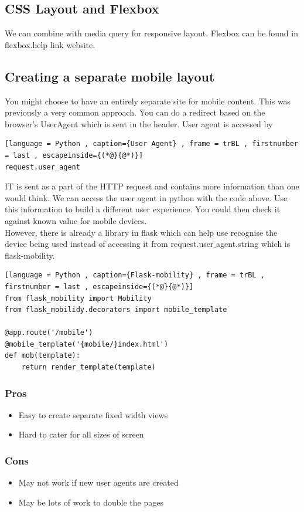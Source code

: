 \documentclass[a4paper]{article}
\theoremstyle{plain}
\theoremstyle{definition}
\theoremstyle{remark}
\begin{document}
\begin{flushleft}
\subsection{CSS Layout and Flexbox}
We can combine with media query for responsive layout. Flexbox can be found in flexbox.help link website. 
\subsection{Creating a separate mobile layout}
You might choose to have an entirely separate site for mobile content. This was previously a very common approach. You can do a redirect based on the browser's UserAgent which is sent in the header. User agent is accessed by
\begin{lstlisting}[language = Python , caption={User Agent} , frame = trBL , firstnumber = last , escapeinside={(*@}{@*)}]
request.user_agent
\end{lstlisting}
IT is sent as a part of the HTTP request and contains more information than one would think. We can access the user agent in python with the code above. Use this information to build a different user experience. You could then check it against known value for mobile devices. \\
However, there is already a library in flask which can help use recognise the device being used instead of accessing it from request.user$\_$agent.string which is flask-mobility.
\begin{lstlisting}[language = Python , caption={Flask-mobility} , frame = trBL , firstnumber = last , escapeinside={(*@}{@*)}]
from flask_mobility import Mobility
from flask_mobilidy.decorators import mobile_template

@app.route('/mobile')
@mobile_template('{mobile/}index.html')
def mob(template):
	return render_template(template)
\end{lstlisting}
\subsubsection{Pros}
\begin{itemize}
	\item Easy to create separate fixed width views
	\item Hard to cater for all sizes of screen
\end{itemize}
\subsubsection{Cons}
\begin{itemize}
	\item May not work if new user agents are created
	\item May be lots of work to double the pages
\end{itemize}

\end{flushleft}
\end{document}
